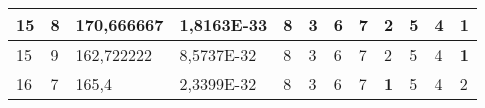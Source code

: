 \documentclass[conference]{IEEEtran}
\begin{document}
\begin{table*}[]
\begin{tabular}{|llll|llllllll|}
\multicolumn{1}{|l|}{15}                                                    & \multicolumn{1}{l|}{8}                                                        & \multicolumn{1}{l|}{170,666667}                                                   & 1,8163E-33                     & \multicolumn{1}{l|}{8}                                                  & \multicolumn{1}{l|}{3}                                                  & \multicolumn{1}{l|}{6}                                                  & \multicolumn{1}{l|}{7}                                                  & \multicolumn{1}{l|}{2}                                                  & \multicolumn{1}{l|}{5}                                                  & \multicolumn{1}{l|}{4}                                                  & \textbf{1}                 \\ \hline
\multicolumn{1}{|l|}{15}                                                    & \multicolumn{1}{l|}{9}                                                        & \multicolumn{1}{l|}{162,722222}                                                   & 8,5737E-32                     & \multicolumn{1}{l|}{8}                                                  & \multicolumn{1}{l|}{3}                                                  & \multicolumn{1}{l|}{6}                                                  & \multicolumn{1}{l|}{7}                                                  & \multicolumn{1}{l|}{2}                                                  & \multicolumn{1}{l|}{5}                                                  & \multicolumn{1}{l|}{4}                                                  & \textbf{1}                 \\ \hline
\multicolumn{1}{|l|}{16}                                                    & \multicolumn{1}{l|}{7}                                                        & \multicolumn{1}{l|}{165,4}                                                        & 2,3399E-32                     & \multicolumn{1}{l|}{8}                                                  & \multicolumn{1}{l|}{3}                                                  & \multicolumn{1}{l|}{6}                                                  & \multicolumn{1}{l|}{7}                                                  & \multicolumn{1}{l|}{\textbf{1}}                                         & \multicolumn{1}{l|}{5}                                                  & \multicolumn{1}{l|}{4}                                                  & 2                          \\ \hline

\end{tabular}
\end{table*}
\end{document}
